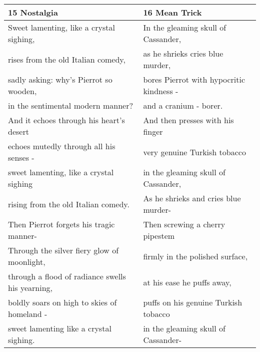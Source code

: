 \begin{table}[h!]
\begin{tabular}{p{8.0cm}|p{8.0cm}}
15 Nostalgia& 16 Mean Trick \\\hline
Sweet lamenting, like a crystal sighing,& In the gleaming skull of Cassander,\\
rises from the old Italian comedy,& as he shrieks cries blue murder,\\
sadly asking: why's Pierrot so wooden,& bores Pierrot with hypocritic kindness -\\ 
in the sentimental modern manner?& and a cranium - borer.\\
And it echoes through his heart's desert& And then presses with his finger\\
echoes mutedly through all his senses - & very genuine Turkish tobacco\\
sweet lamenting, like a crystal sighing& in the gleaming skull of Cassander,\\
rising from the old Italian comedy.& As he shrieks and cries blue murder-\\
Then Pierrot forgets his tragic manner- & Then screwing a cherry pipestem\\
Through the silver fiery glow of moonlight,& firmly in the polished surface,\\
through a flood of radiance swells his yearning,& at his ease he puffs away,\\
boldly soars on high to skies of homeland - & puffs on his genuine Turkish tobacco\\
sweet lamenting like a crystal sighing.& in the gleaming skull of Cassander-\\\hline




\end{tabular}
\end{table}
